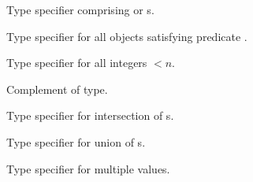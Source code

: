 \begin{LIST}{1cm}
  {
  Type specifier comprising  or s.
  }

  {
  Type specifier for all objects satisfying predicate . 
  }

  {
  Type specifier for all integers $<n$.
  }

  {
  Complement of type.
  }

  {
  Type specifier for intersection of s.
  }

  {
  Type specifier for union of s.
  }

  {
  Type specifier for multiple values.
  }

  \end{LIST}


